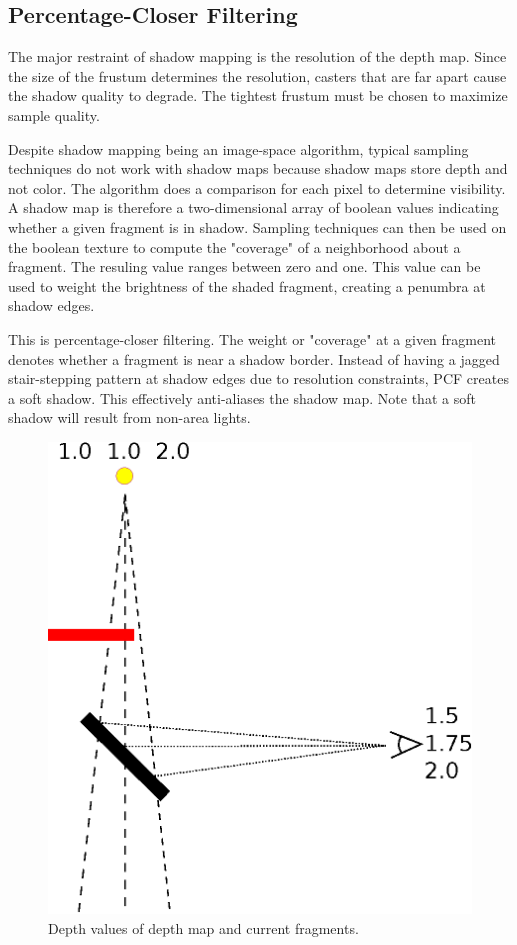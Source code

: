 \documentclass[12pt]{article}
\begin{document}
\subsection{Percentage-Closer Filtering}

The major restraint of shadow mapping is the resolution of the depth map. Since the size of the frustum determines the resolution, casters that are far apart cause the shadow quality to degrade. The tightest frustum must be chosen to maximize sample quality.

Despite shadow mapping being an image-space algorithm, typical sampling techniques do not work with shadow maps because shadow maps store depth and not color. The algorithm does a comparison for each pixel to determine visibility. A shadow map is therefore a two-dimensional array of boolean values indicating whether a given fragment is in shadow. Sampling techniques can then be used on the boolean texture to compute the "coverage" of a neighborhood about a fragment. The resuling value ranges between zero and one.
This value can be used to weight the brightness of the shaded fragment, creating a penumbra at shadow edges.

This is percentage-closer filtering. The weight or "coverage" at a given fragment denotes whether a fragment is near a shadow border. Instead of having a jagged stair-stepping pattern at shadow edges due to resolution constraints, PCF creates a soft shadow.
This effectively anti-aliases the shadow map. Note that a soft shadow will result from non-area lights.

\begin{figure}
\centering
\includegraphics[scale=0.5]{depth.eps}
\caption{\label{fig:depth} Depth values of depth map and current fragments.}
\end{figure}
\end{document}
